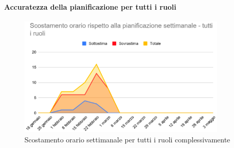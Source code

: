 \paragraph{Accuratezza della pianificazione per tutti i ruoli}
\begin{figure}[H]
	\centering
	\includegraphics[width=10cm]{res/images/tutti}
	\caption{Scostamento orario settimanale per tutti i ruoli complessivamente}
	\label{fig:Scostamento orario settimanale per tutti i ruoli complessivamente}
\end{figure}
